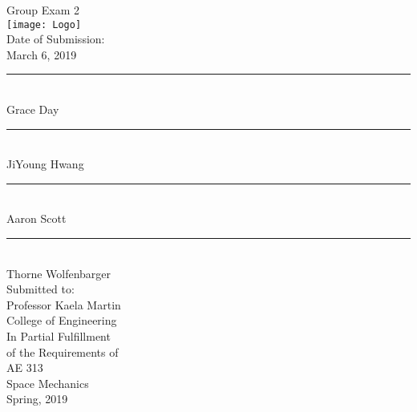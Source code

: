 

\begin{center}
  {\huge Group Exam 2}\\
  \vspace{10px}
  \texttt{[image: Logo]} \\
  Date of Submission:\\
  March 6, 2019\\
  \vspace{30px}
  \rule{300px}{0.5px} \\
  Grace Day\\
  \vspace{30px}
  \rule{300px}{0.5px} \\
  JiYoung Hwang\\
  \vspace{30px}
  \rule{300px}{0.5px} \\
  Aaron Scott\\
  \vspace{30px}
  \rule{300px}{0.5px} \\
  Thorne Wolfenbarger\\
  \vspace{30px}
  Submitted to: \\
  Professor Kaela Martin \\
  College of Engineering \\
  \vspace{40px}
  In Partial Fulfillment \\
  of the Requirements of \\
  \vspace{10px}
  AE 313 \\
  Space Mechanics \\
  Spring, 2019 \\
\end{center}
